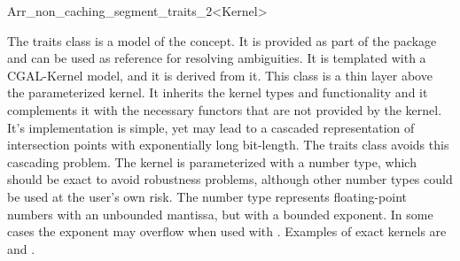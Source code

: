 \ccRefPageBegin
\begin{ccRefClass}{Arr_non_caching_segment_traits_2<Kernel>}
    
\ccDefinition 
  The traits class  is a
  model of the  concept. It is provided as part of
  the package and can be used as reference for resolving ambiguities. 
  It is templated with a CGAL-Kernel model, and it is derived from it. This
  class is a thin layer above the parameterized kernel. It inherits the kernel
  types and functionality and it complements it with the necessary functors that
  are not provided by the kernel. It's implementation is simple, yet may lead to
  a cascaded representation of intersection points with exponentially long
  bit-length. The  traits class avoids this
  cascading problem. The kernel is parameterized with a number type, which
  should be exact to avoid robustness problems, although other number types
  could be used at the user's own risk. The  number
  type represents floating-point numbers with an unbounded mantissa, but with a
  bounded exponent. In some cases the exponent may overflow when used with
  . Examples of exact
  kernels are  and .
    
 
\ccIsModel

\end{ccRefClass}
\ccRefPageEnd
